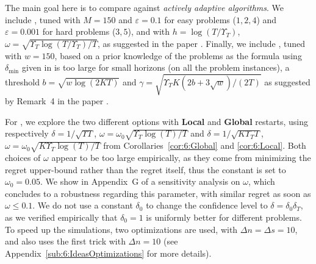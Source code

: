 The main goal here is to compare against \emph{actively adaptive algorithms}. We include \CUSUMklUCB, tuned with $M=150$ and $\varepsilon=0.1$ for easy problems ($1,2,4$) and $\varepsilon=0.001$ for hard problems ($3,5$),
and with $h = \log(T/\Upsilon_T)$, $\omega = \sqrt{\Upsilon_T \log(T/\Upsilon_T) / T}$, as suggested in the paper \cite{LiuLeeShroff17}.
%
Finally, we include \MklUCB,
tuned with $w=150$, based on a prior knowledge of the problems as the formula using $\delta_{\min}$ given in \cite{CaoZhenKvetonXie18} is too large for small horizons (on all the problem instances), a threshold $b=\sqrt{w \log(2 K T)}$ and $\gamma=\sqrt{\Upsilon_T K (2 b + 3 \sqrt{w}) / (2 T)}$ as suggested by Remark~4 in the paper \cite{CaoZhenKvetonXie18}.


For \GLRklUCB, we explore the two different options with \textbf{Local} and \textbf{Global} restarts,
using respectively
$\delta = 1/\sqrt{\Upsilon T}$, $\omega = \omega_0 \sqrt{\Upsilon_T \log(T) /T}$
and
$\delta = 1/\sqrt{K \Upsilon_T T}$, $\omega = \omega_0\sqrt{K \Upsilon_T \log(T) / T}$
from Corollaries~\ref{cor:6:Global} and \ref{cor:6:Local}.
Both choices of $\omega$ appear to be too large empirically, as they come from minimizing the regret upper-bound rather than the regret itself, thus
the constant is set to $\omega_0 = 0.05$.
We show in Appendix~G of \cite{Besson2019GLRT} a sensitivity analysis on $\omega$,
which concludes to a robustness regarding this parameter, with similar regret as soon as $\omega\leq0.1$.
We do not use a constant $\delta_0$ to change the confidence level to $\delta = \delta_0 \delta_T$, as we
verified empirically
that $\delta_0=1$ is uniformly better for different problems.
%
To speed up the simulations, two optimizations are used, with $\Delta n = \Delta s = 10$,
and \CUSUM{} also uses the first trick with $\Delta n = 10$ (see Appendix~\ref{sub:6:IdeasOptimizations} for more details).


